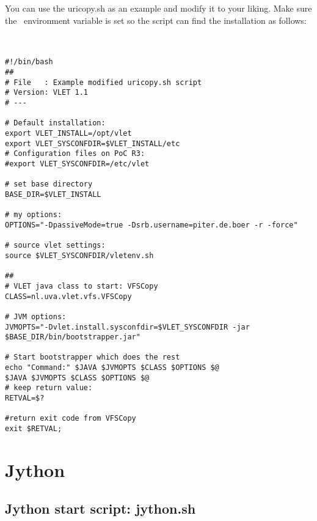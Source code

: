 You can use the uricopy.sh as an example and modify it to your liking. Make sure 
the \VLETINSTALL\ environment variable is set so the script can find the
installation as follows: \\
\\
\hspace*{5mm}\begin{boxedminipage}{165mm}
\begin{verbatim}

#!/bin/bash 
##
# File   : Example modified uricopy.sh script 
# Version: VLET 1.1
# --- 

# Default installation: 
export VLET_INSTALL=/opt/vlet
export VLET_SYSCONFDIR=$VLET_INSTALL/etc
# Configuration files on PoC R3: 
#export VLET_SYSCONFDIR=/etc/vlet

# set base directory 
BASE_DIR=$VLET_INSTALL

# my options: 
OPTIONS="-DpassiveMode=true -Dsrb.username=piter.de.boer -r -force"

# source vlet settings: 
source $VLET_SYSCONFDIR/vletenv.sh 

##
# VLET java class to start: VFSCopy 
CLASS=nl.uva.vlet.vfs.VFSCopy

# JVM options: 
JVMOPTS="-Dvlet.install.sysconfdir=$VLET_SYSCONFDIR -jar $BASE_DIR/bin/bootstrapper.jar"

# Start bootstrapper which does the rest 
echo "Command:" $JAVA $JVMOPTS $CLASS $OPTIONS $@
$JAVA $JVMOPTS $CLASS $OPTIONS $@
# keep return value: 
RETVAL=$? 

#return exit code from VFSCopy
exit $RETVAL; 

\end{verbatim}
\end{boxedminipage}

\section{Jython}

\subsection{Jython start script: jython.sh}

